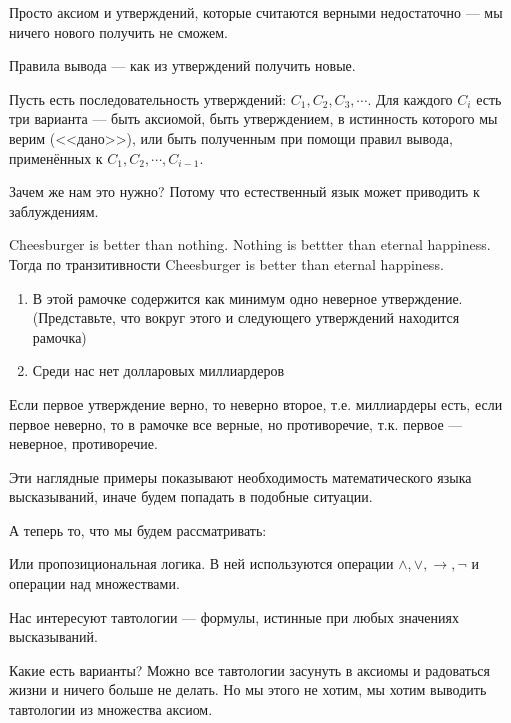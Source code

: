 Просто аксиом и утверждений, которые считаются верными недостаточно --- мы ничего нового получить не сможем.

\begin{definition}
Правила вывода --- как из утверждений получить новые.

Пусть есть последовательность утверждений: $C_1, C_2, C_3, \cdots$. Для каждого $C_i$ есть три варианта --- быть аксиомой, быть утверждением, в истинность которого мы верим (<<дано>>), или быть полученным при помощи правил вывода, применённых к $C_1, C_2, \cdots, C_{i-1}$. 

\end{definition}

Зачем же нам это нужно? Потому что естественный язык может приводить к заблуждениям.

\begin{example}
	Cheesburger is better than nothing. Nothing is bettter than eternal happiness. Тогда по транзитивности Cheesburger is better than eternal happiness.
\end{example}

\begin{example}
	\begin{enumerate}
		\item{В этой рамочке содержится как минимум одно неверное утверждение. (Представьте, что вокруг этого и следующего утверждений находится рамочка)}
		\item{Среди нас нет долларовых миллиардеров}

	\end{enumerate}
	Если первое утверждение верно, то неверно второе, т.е. миллиардеры есть, если первое неверно, то в рамочке все верные, но противоречие, т.к. первое --- неверное, противоречие.
\end{example}

Эти наглядные примеры показывают необходимость математического языка высказываний, иначе будем попадать в подобные ситуации.

А теперь то, что мы будем рассматривать:


Или пропозициональная логика. В ней используются операции $\land, \lor, \to, \lnot$ и операции над множествами.

Нас интересуют тавтологии --- формулы, истинные при любых значениях высказываний.

Какие есть варианты? Можно все тавтологии засунуть в аксиомы и радоваться жизни и ничего больше не делать. Но мы этого не хотим, мы хотим выводить тавтологии из множества аксиом.

